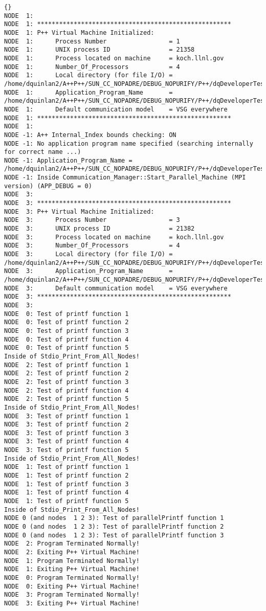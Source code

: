 \documentclass[10pt]{llncs}
\begin{document}
\begin{lstlisting}{}
NODE  1: 
NODE  1: ***************************************************** 
NODE  1: P++ Virtual Machine Initialized: 
NODE  1:      Process Number                 = 1 
NODE  1:      UNIX process ID                = 21358 
NODE  1:      Process located on machine     = koch.llnl.gov 
NODE  1:      Number_Of_Processors           = 4 
NODE  1:      Local directory (for file I/O) = /home/dquinlan2/A++P++/SUN_CC_NOPADRE/DEBUG_NOPURIFY/P++/dqDeveloperTests  
NODE  1:      Application_Program_Name       = /home/dquinlan2/A++P++/SUN_CC_NOPADRE/DEBUG_NOPURIFY/P++/dqDeveloperTests/test2002_01 
NODE  1:      Default communication model    = VSG everywhere 
NODE  1: ***************************************************** 
NODE  1: 
NODE -1: A++ Internal_Index bounds checking: ON 
NODE -1: No application program name specified (searching internally for correct name ...) 
NODE -1: Application_Program_Name = /home/dquinlan2/A++P++/SUN_CC_NOPADRE/DEBUG_NOPURIFY/P++/dqDeveloperTests/test2002_01 
NODE -1: Inside Communication_Manager::Start_Parallel_Machine (MPI version) (APP_DEBUG = 0) 
NODE  3: 
NODE  3: ***************************************************** 
NODE  3: P++ Virtual Machine Initialized: 
NODE  3:      Process Number                 = 3 
NODE  3:      UNIX process ID                = 21382 
NODE  3:      Process located on machine     = koch.llnl.gov 
NODE  3:      Number_Of_Processors           = 4 
NODE  3:      Local directory (for file I/O) = /home/dquinlan2/A++P++/SUN_CC_NOPADRE/DEBUG_NOPURIFY/P++/dqDeveloperTests  
NODE  3:      Application_Program_Name       = /home/dquinlan2/A++P++/SUN_CC_NOPADRE/DEBUG_NOPURIFY/P++/dqDeveloperTests/test2002_01 
NODE  3:      Default communication model    = VSG everywhere 
NODE  3: ***************************************************** 
NODE  3: 
NODE  0: Test of printf function 1 
NODE  0: Test of printf function 2 
NODE  0: Test of printf function 3 
NODE  0: Test of printf function 4 
NODE  0: Test of printf function 5 
Inside of Stdio_Print_From_All_Nodes! 
NODE  2: Test of printf function 1 
NODE  2: Test of printf function 2 
NODE  2: Test of printf function 3 
NODE  2: Test of printf function 4 
NODE  2: Test of printf function 5 
Inside of Stdio_Print_From_All_Nodes! 
NODE  3: Test of printf function 1 
NODE  3: Test of printf function 2 
NODE  3: Test of printf function 3 
NODE  3: Test of printf function 4 
NODE  3: Test of printf function 5 
Inside of Stdio_Print_From_All_Nodes! 
NODE  1: Test of printf function 1 
NODE  1: Test of printf function 2 
NODE  1: Test of printf function 3 
NODE  1: Test of printf function 4 
NODE  1: Test of printf function 5 
Inside of Stdio_Print_From_All_Nodes! 
NODE 0 (and nodes  1 2 3): Test of parallelPrintf function 1 
NODE 0 (and nodes  1 2 3): Test of parallelPrintf function 2 
NODE 0 (and nodes  1 2 3): Test of parallelPrintf function 3 
NODE  2: Program Terminated Normally! 
NODE  2: Exiting P++ Virtual Machine! 
NODE  1: Program Terminated Normally! 
NODE  1: Exiting P++ Virtual Machine! 
NODE  0: Program Terminated Normally! 
NODE  0: Exiting P++ Virtual Machine! 
NODE  3: Program Terminated Normally! 
NODE  3: Exiting P++ Virtual Machine! 

\end{lstlisting}
\end{document}
